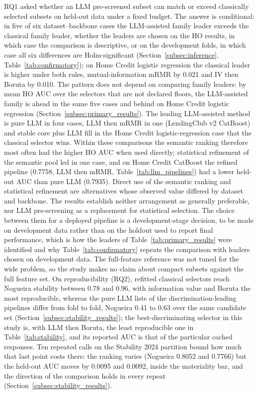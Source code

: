 \documentclass[final,5p,twocolumn]{elsarticle}
\begin{document}
RQ1 asked whether an LLM pre-screened subset can match or exceed classically selected subsets on held-out data under a fixed budget. The answer is conditional: in five of six dataset--backbone cases the LLM-assisted family leader exceeds the classical family leader, whether the leaders are chosen on the HO results, in which case the comparison is descriptive, or on the development folds, in which case all six differences are Holm-significant (Section~\ref{subsec:inference}, Table~\ref{tab:confirmatory}); on Home Credit logistic regression the classical leader is higher under both rules, mutual-information mRMR by 0.021 and IV then Boruta by 0.010. The pattern does not depend on comparing family leaders: by mean HO AUC over the selectors that are not declared floors, the LLM-assisted family is ahead in the same five cases and behind on Home Credit logistic regression (Section~\ref{subsec:primary_results}). The leading LLM-assisted method is pure LLM in four cases, LLM then mRMR in one (LendingClub v2 CatBoost) and stable core plus LLM fill in the Home Credit logistic-regression case that the classical selector wins. Within these comparisons the semantic ranking therefore most often had the higher HO AUC when used directly; statistical refinement of the semantic pool led in one case, and on Home Credit CatBoost the refined pipeline (0.7758, LLM then mRMR, Table~\ref{tab:llm_pipelines}) had a lower held-out AUC than pure LLM (0.7935). Direct use of the semantic ranking and statistical refinement are alternatives whose observed value differed by dataset and backbone. The results establish neither arrangement as generally preferable, nor LLM pre-screening as a replacement for statistical selection. The choice between them for a deployed pipeline is a development-stage decision, to be made on development data rather than on the holdout used to report final performance, which is how the leaders of Table~\ref{tab:primary_results} were identified and why Table~\ref{tab:confirmatory} repeats the comparison with leaders chosen on development data. The full-feature reference was not tuned for the wide problem, so the study makes no claim about compact subsets against the full feature set. On reproducibility (RQ2), refitted classical selectors reach Nogueira stability between 0.78 and 0.96, with information value and Boruta the most reproducible, whereas the pure LLM lists of the discrimination-leading pipelines differ from fold to fold, Nogueira 0.41 to 0.63 over the same candidate set (Section~\ref{subsec:stability_results}); the best-discriminating selector in this study is, with LLM then Boruta, the least reproducible one in Table~\ref{tab:stability}, and its reported AUC is that of the particular cached responses. Ten repeated calls on the Stability 2024 partition bound how much that last point costs there: the ranking varies (Nogueira 0.8052 and 0.7766) but the held-out AUC moves by 0.0095 and 0.0092, inside the materiality bar, and the direction of the comparison holds in every repeat (Section~\ref{subsec:stability_results}).
\end{document}
